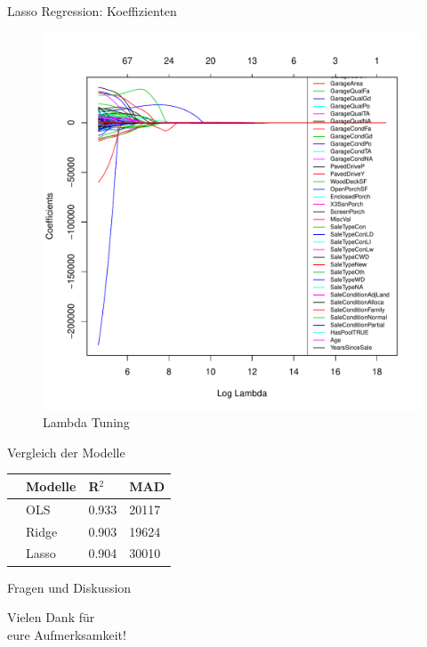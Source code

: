 \documentclass[10pt]{beamer}
\begin{document}
\begin{frame}{Lasso Regression: Koeffizienten}
	
	\begin{figure}
		\centering
		\includegraphics[height=.7\textheight]{figures/lasso_coeff.pdf}
		\caption{Lambda Tuning}
	\end{figure}
	
\end{frame}



\begin{frame}{Vergleich der Modelle}
\begin{table}[ht]
\centering
\begin{tabular}{rlll}
  \hline
 & Modelle & R$^2$ & MAD \\ 
  \hline
   & OLS & 0.933 & 20117 \\ 
   & Ridge & 0.903 & 19624 \\ 
   & Lasso & 0.904 & 30010\\ 
   \hline
\end{tabular}
\end{table}

\end{frame}

\begin{frame}{Fragen und Diskussion}
	\begin{LARGE}
		\begin{center}
			Vielen Dank für\\eure Aufmerksamkeit!
		\end{center}
	\end{LARGE}
\end{frame}
\end{document}
